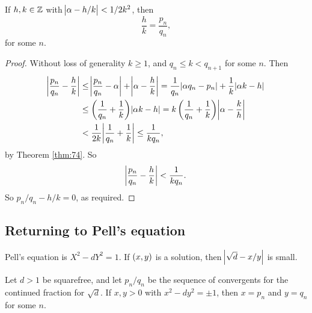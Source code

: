 \begin{corollary}
\label{cor:75}
If $ h, k \in \mathbb{Z} $ with $ \abs{\alpha - h / k} < 1 / 2k^2 $, then
$$ \dfrac{h}{k} = \dfrac{p_n}{q_n}, $$
for some $ n $.
\end{corollary}

\begin{proof}
Without loss of generality $ k \ge 1 $, and $ q_n \le k < q_{n + 1} $ for some $ n $. Then
\begin{align*}
\abs{\dfrac{p_n}{q_n} - \dfrac{h}{k}}
& \le \abs{\dfrac{p_n}{q_n} - \alpha} + \abs{\alpha - \dfrac{h}{k}}
= \dfrac{1}{q_n}\abs{\alpha q_n - p_n} + \dfrac{1}{k}\abs{\alpha k - h} \\
& \le \br{\dfrac{1}{q_n} + \dfrac{1}{k}}\abs{\alpha k - h}
= k\br{\dfrac{1}{q_n} + \dfrac{1}{k}}\abs{\alpha - \dfrac{k}{h}} \\
& < \dfrac{1}{2k}\abs{\dfrac{1}{q_n} + \dfrac{1}{k}}
\le \dfrac{1}{kq_n},
\end{align*}
by Theorem \ref{thm:74}. So
$$ \abs{\dfrac{p_n}{q_n} - \dfrac{h}{k}} < \dfrac{1}{kq_n}. $$
So $ p_n / q_n - h / k = 0 $, as required.
\end{proof}

\pagebreak

\subsection{Returning to Pell's equation}


Pell's equation is $ X^2 - dY^2 = 1 $. If $ \br{x, y} $ is a solution, then $ \abs{\sqrt{d} - x / y} $ is small.

\begin{proposition}
Let $ d > 1 $ be squarefree, and let $ p_n / q_n $ be the sequence of convergents for the continued fraction for $ \sqrt{d} $. If $ x, y > 0 $ with $ x^2 - dy^2 = \pm 1 $, then $ x = p_n $ and $ y = q_n $ for some $ n $.
\end{proposition}

